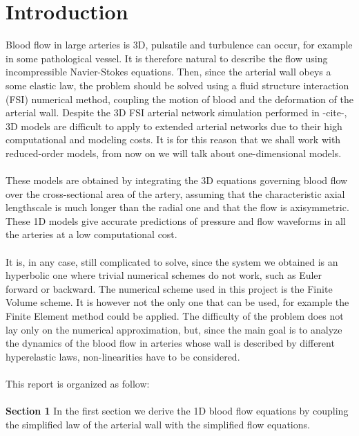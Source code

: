 \documentclass[12pt,a4paper]{article}
\numberwithin{equation}{section}
\begin{document}
\newpage

\section*{Introduction}
Blood flow in large arteries is 3D, pulsatile and turbulence can occur, for example in some pathological vessel. It is therefore natural to describe the flow using incompressible Navier-Stokes equations. Then, since the arterial wall obeys a some elastic law, the problem should be solved using a fluid structure interaction (FSI) numerical method, coupling the motion of blood and the deformation of the arterial wall. 
Despite the 3D FSI arterial network simulation performed in -cite-, 3D models are difficult to apply to extended arterial networks due to their high computational and modeling costs. It is for this reason that we shall work with reduced-order models, from now on we will talk about one-dimensional models.\\
\\
These models are obtained by integrating the 3D equations governing blood flow over the cross-sectional area of the artery, assuming that the characteristic axial lengthscale is much longer than the radial one and that the flow is axisymmetric. These 1D models give accurate predictions of pressure and flow waveforms in all the arteries at a low computational cost.\\
\\
It is, in any case, still complicated to solve, since the system we obtained is an hyperbolic one where trivial numerical schemes do not work, such as Euler forward or backward. The numerical scheme used in this project is the Finite Volume scheme. It is however not the only one that can be used, for example the Finite Element method could be applied. The difficulty of the problem does not lay only on the numerical approximation, but, since the main goal is to analyze the dynamics of the blood flow in arteries whose wall is described by different hyperelastic laws, non-linearities have to be considered.\\
\\
This report is organized as follow:\\
\\
{\bf Section 1} \hspace{1mm} In the first section we derive the 1D blood flow equations by coupling the simplified law of the arterial wall with the simplified flow equations.\\
\end{document}
